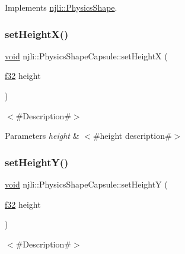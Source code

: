 Implements \mbox{\hyperlink{classnjli_1_1_physics_shape_a441e82a42f3b588a409c3b6c41288abd}{njli\+::\+Physics\+Shape}}.

\mbox{\label{classnjli_1_1_physics_shape_capsule_a1983fb785ef1314f92027dd209d96774}} 
\subsubsection{\texorpdfstring{set\+Height\+X()}{setHeightX()}}
{\footnotesize\ttfamily \mbox{\hyperlink{_thread_8h_af1e856da2e658414cb2456cb6f7ebc66}{void}} njli\+::\+Physics\+Shape\+Capsule\+::set\+HeightX (\begin{DoxyParamCaption}\item[{\mbox{\hyperlink{_util_8h_a5f6906312a689f27d70e9d086649d3fd}{f32}}}]{height }\end{DoxyParamCaption})}

$<$\#\+Description\#$>$


\begin{DoxyParams}{Parameters}
{\em height} & $<$\#height description\#$>$ \\
\hline
\end{DoxyParams}
\mbox{\label{classnjli_1_1_physics_shape_capsule_a3352f7dee2c3f947f8f71ad1c4d9b46e}} 
\subsubsection{\texorpdfstring{set\+Height\+Y()}{setHeightY()}}
{\footnotesize\ttfamily \mbox{\hyperlink{_thread_8h_af1e856da2e658414cb2456cb6f7ebc66}{void}} njli\+::\+Physics\+Shape\+Capsule\+::set\+HeightY (\begin{DoxyParamCaption}\item[{\mbox{\hyperlink{_util_8h_a5f6906312a689f27d70e9d086649d3fd}{f32}}}]{height }\end{DoxyParamCaption})}

$<$\#\+Description\#$>$


